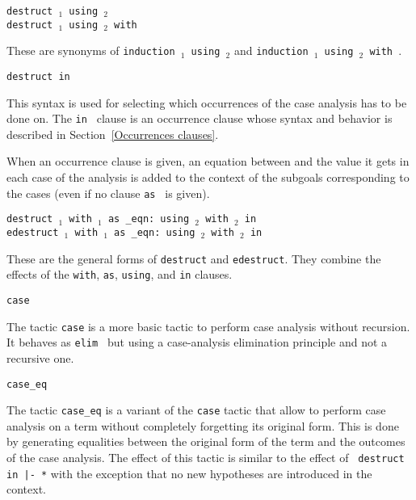 \begin{Variants}
\item{\tt destruct {\term$_1$} using {\term$_2$}}\\
     {\tt destruct {\term$_1$} using {\term$_2$} with {\bindinglist}}

  These are synonyms of {\tt induction {\term$_1$} using {\term$_2$}} and
  {\tt induction {\term$_1$} using {\term$_2$} with {\bindinglist}}.

\item \texttt{destruct {\term} in {\occgoalset}}

  This syntax is used for selecting which occurrences of {\term} the
  case analysis has to be done on. The {\tt in {\occgoalset}} clause is an
  occurrence clause whose syntax and behavior is described in
  Section~\ref{Occurrences clauses}.

  When an occurrence clause is given, an equation between {\term} and
  the value it gets in each case of the analysis is added to the
  context of the subgoals corresponding to the cases (even
  if no clause {\tt as {\namingintropattern}} is given).

\item{\tt destruct {\term$_1$} with {\bindinglist$_1$} as {\disjconjintropattern} \_eqn: {\namingintropattern}  using {\term$_2$} with {\bindinglist$_2$} in {\occgoalset}}\\
     {\tt edestruct {\term$_1$} with {\bindinglist$_1$} as {\disjconjintropattern} \_eqn: {\namingintropattern} using {\term$_2$} with {\bindinglist$_2$} in {\occgoalset}}

  These are the general forms of {\tt destruct} and {\tt edestruct}.
  They combine the effects of the {\tt with}, {\tt as}, {\tt using},
  and {\tt in} clauses.

\item{\tt case \term}\label{case}
  
  The tactic {\tt case} is a more basic tactic to perform case
  analysis without recursion. It behaves as {\tt elim \term} but using
  a case-analysis elimination principle and not a recursive one.

\item{\tt case\_eq \term}\label{case_eq}

 The tactic {\tt case\_eq} is a variant of the {\tt case} tactic that
 allow to perform case analysis on a term without completely
 forgetting its original form. This is done by generating equalities
 between the original form of the term and the outcomes of the case
 analysis. The effect of this tactic is similar to the effect of {\tt
 destruct {\term} in |- *} with the exception that no new hypotheses 
 are introduced in the context.


\end{Variants}
